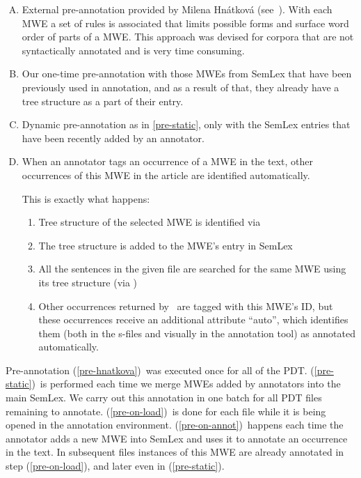 \begin{enumerate}[A)]

\item \label{pre-hnatkova}External pre-annotation provided by Milena Hnátková (see~\citealp{hnatkova:2002}). With each MWE a set of rules is associated that limits possible forms and surface word order of parts of a MWE. This approach was devised for corpora that are not syntactically annotated and is very time consuming.

\item \label{pre-static}Our one-time pre-annotation with those MWEs from SemLex that have been previously used in annotation, and as a result of that, they already have a tree structure as a part of their entry.

\item \label{pre-on-load}Dynamic pre-annotation as in \ref{pre-static}, only with the SemLex entries that have been recently added by an annotator. 

\item \label{pre-on-annot}When an annotator tags an occurrence of a MWE in the text, other occurrences of this MWE in the article are identified automatically.

This is exactly what happens:
	\begin{enumerate}[1)]
	\item Tree structure of the selected MWE is identified via \ntred
	\item The tree structure is added to the MWE's entry in SemLex
	\item All the sentences in the given file are searched for the same MWE using its tree structure (via  \ntred)
	\item Other occurrences returned by  \ntred\ are tagged with this MWE's ID, but these occurrences receive an additional attribute ``auto'', which identifies them (both in the s-files and visually in the annotation tool) as annotated automatically.
	\end{enumerate}

\end{enumerate}

Pre-annotation (\ref{pre-hnatkova})~was executed once for all of the PDT. (\ref{pre-static})~is performed each time we merge MWEs added by annotators into the main SemLex. We carry out this annotation in one batch for all PDT files remaining to annotate. (\ref{pre-on-load})~is done for each file while it is being opened in the annotation environment. 
(\ref{pre-on-annot})~happens each time the annotator adds a new MWE into SemLex and uses it to annotate an occurrence in the text. In subsequent files instances of this MWE are already annotated in step (\ref{pre-on-load}), and later even in (\ref{pre-static}).
 
